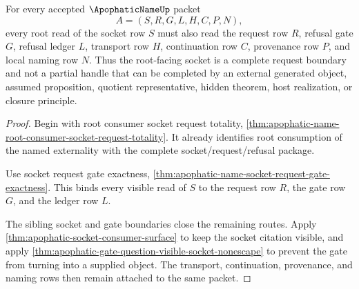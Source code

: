 \begin{theorem}
\label{thm:apophatic-name-root-socket-request-totality}
For every accepted $\ApophaticNameUp$ packet
$$
A=(S,R,G,L,H,C,P,N),
$$
every root read of the socket row $S$ must also read the request row $R$, refusal gate $G$, refusal ledger $L$, transport row $H$, continuation row $C$, provenance row $P$, and local naming row $N$. Thus the root-facing socket is a complete request boundary and not a partial handle that can be completed by an external generated object, assumed proposition, quotient representative, hidden theorem, host realization, or closure principle.
\end{theorem}
\begin{proof}
Begin with root consumer socket request totality, \autoref{thm:apophatic-name-root-consumer-socket-request-totality}. It already identifies root consumption of the named externality with the complete socket/request/refusal package.

Use socket request gate exactness, \autoref{thm:apophatic-name-socket-request-gate-exactness}. This binds every visible read of $S$ to the request row $R$, the gate row $G$, and the ledger row $L$.

The sibling socket and gate boundaries close the remaining routes. Apply \autoref{thm:apophatic-socket-consumer-surface} to keep the socket citation visible, and apply \autoref{thm:apophatic-gate-question-visible-socket-nonescape} to prevent the gate from turning into a supplied object. The transport, continuation, provenance, and naming rows then remain attached to the same packet.
\end{proof}


